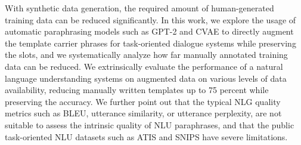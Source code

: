With synthetic data generation, the required amount of human-generated training data can be reduced significantly. In this work, we explore the usage of automatic paraphrasing models such as GPT-2 and CVAE to directly augment the template carrier phrases for task-oriented dialogue systems while preserving the slots, and we systematically analyze how far manually annotated training data can be reduced. We extrinsically evaluate the performance of a natural language understanding systems on augmented data on various levels of data availability, reducing manually written templates up to 75 percent while preserving the accuracy. We further point out that the typical NLG quality metrics such as BLEU, utterance similarity, or utterance perplexity, are not suitable to assess the intrinsic quality of NLU paraphrases, and that the public task-oriented NLU datasets such as ATIS and SNIPS have severe limitations.
